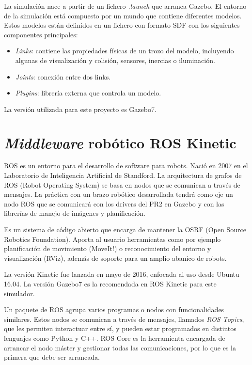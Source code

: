 \documentclass[12pt,spanish,chapterprefix, numbers=noenddot]{book}
\numberwithin{equation}{section}
\numberwithin{figure}{section}
\begin{document}
La simulación nace a partir de un fichero \textit{.launch} que arranca Gazebo. El entorno de la simulación está compuesto por un mundo que contiene diferentes modelos. Estos modelos están definidos en un fichero con formato SDF con los siguientes componentes principales:

\begin{itemize}
\item \textit{Links}: contiene las propiedades físicas de un trozo del modelo, incluyendo algunas de visualización y colisión, sensores, inercias o iluminación.
\item \textit{Joints}: conexión entre dos links.
\item \textit{Plugins}: librería externa que controla un modelo. 
\end{itemize}

La versión utilizada para este proyecto es Gazebo7.

\section{\textit{Middleware} robótico ROS Kinetic}
ROS es un entorno para el desarrollo de software para robots. Nació en 2007 en el Laboratorio de Inteligencia Artificial de Standford. La arquitectura de grafos de ROS (Robot Operating System) se basa en nodos que se comunican a través de mensajes. La práctica con un brazo robótico desarrollada tendrá como eje un nodo ROS que se comunicará con los drivers del PR2 en Gazebo y con las librerías de manejo de imágenes y planificación. 

Es un sistema de código abierto que encarga de mantener la OSRF (Open Source Robotics Foundation). Aporta al usuario herramientas como por ejemplo planificación de movimiento (MoveIt!) o reconocimiento del entorno y visualización (RViz), además de soporte para un amplio abanico de robots. 

La versión Kinetic fue lanzada en mayo de 2016, enfocada al uso desde Ubuntu 16.04. La versión Gazebo7 es la recomendada en ROS Kinetic para este simulador. 

Un paquete de ROS agrupa varios programas o nodos con funcionalidades similares. Estos nodos se comunican  a través de mensajes, llamados \textit{ROS Topics}, que les permiten interactuar entre sí, y pueden estar programados en distintos lenguajes como Python y C++.
ROS Core es la herramienta encargada de arrancar el nodo máster y gestionar todas las comunicaciones, por lo que es la primera que debe ser arrancada. 
\end{document}
